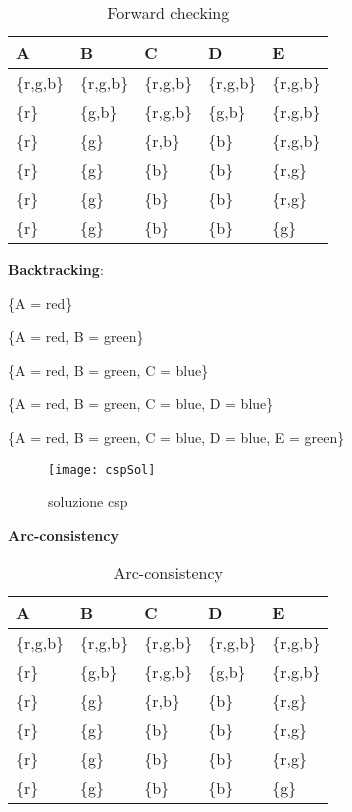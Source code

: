\begin{table}[H]
\centering
\begin{tabular}{|l|l|l|l|l|}
\hline
A & B & C & D & E \\ \hline
\{r,g,b\} & \{r,g,b\} & \{r,g,b\} & \{r,g,b\} & \{r,g,b\} \\
\{r\} & \{g,b\} & \{r,g,b\} & \{g,b\} & \{r,g,b\} \\
\{r\} & \{g\} & \{r,b\} & \{b\} & \{r,g,b\} \\
\{r\} & \{g\} & \{b\} & \{b\} & \{r,g\} \\
\{r\} & \{g\} & \{b\} & \{b\} & \{r,g\} \\
\{r\} & \{g\} & \{b\} & \{b\} & \{g\} \\ \hline
\end{tabular}
\caption{Forward checking}
\end{table}

\textbf{Backtracking}:

\{A = red\}

\{A = red, B = green\}

\{A = red, B = green, C = blue\}

\{A = red, B = green, C = blue, D = blue\}

\{A = red, B = green, C = blue, D = blue, E = green\}\\

\begin{figure}[H]
\centering
\texttt{[image: cspSol]}
\caption{soluzione csp}
\end{figure}

\textbf{Arc-consistency}

\begin{table}[H]
\centering
\begin{tabular}{|l|l|l|l|l|}
\hline
A & B & C & D & E \\ \hline
\{r,g,b\} & \{r,g,b\} & \{r,g,b\} & \{r,g,b\} & \{r,g,b\} \\
\{r\} & \{g,b\} & \{r,g,b\} & \{g,b\} & \{r,g,b\} \\
\{r\} & \{g\} & \{r,b\} & \{b\} & \{r,g\} \\
\{r\} & \{g\} & \{b\} & \{b\} & \{r,g\} \\
\{r\} & \{g\} & \{b\} & \{b\} & \{r,g\} \\
\{r\} & \{g\} & \{b\} & \{b\} & \{g\} \\ \hline
\end{tabular}
\caption{Arc-consistency}
\end{table}

